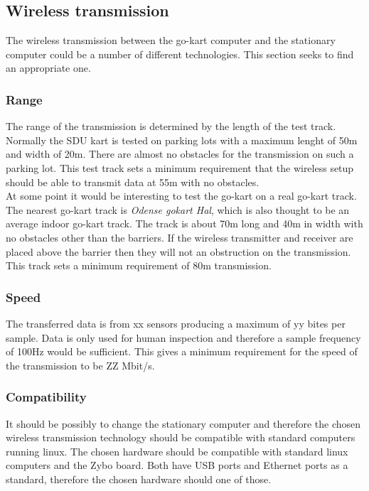 
\subsection{Wireless transmission}
The wireless transmission between the go-kart computer and the stationary computer could be a number of different technologies.
This section seeks to find an appropriate one.

\subsubsection{Range}
The range of the transmission is determined by the length of the test track. 
Normally the SDU kart is tested on parking lots with a maximum lenght of 50m and width of 20m.
There are almost no obstacles for the transmission on such a parking lot. 
This test track sets a minimum requirement that the wireless setup should be able to transmit data at 55m with no obstacles.
\\
At some point it would be interesting to test the go-kart on a real go-kart track. 
The nearest go-kart track is \textit{Odense gokart Hal}, which is also thought to be an average indoor go-kart track.
The track is about 70m long and 40m in width with no obstacles other than the barriers. 
If the wireless transmitter and receiver are placed above the barrier then they will not an obstruction on the transmission. 
This track sets a minimum requirement of 80m transmission. 

\subsubsection{Speed}
The transferred data is from xx sensors producing a maximum of yy bites per sample. 
Data is only used for human inspection and therefore a sample frequency of 100Hz would be sufficient.
This gives a minimum requirement for the speed of the transmission to be ZZ Mbit/s. 

\subsubsection{Compatibility}
It should be possibly to change the stationary computer and therefore the chosen wireless transmission technology should be compatible with standard computers running linux.
The chosen hardware should be compatible with standard linux computers and the Zybo board. 
Both have USB ports and Ethernet ports as a standard, therefore the chosen hardware should one of those.


